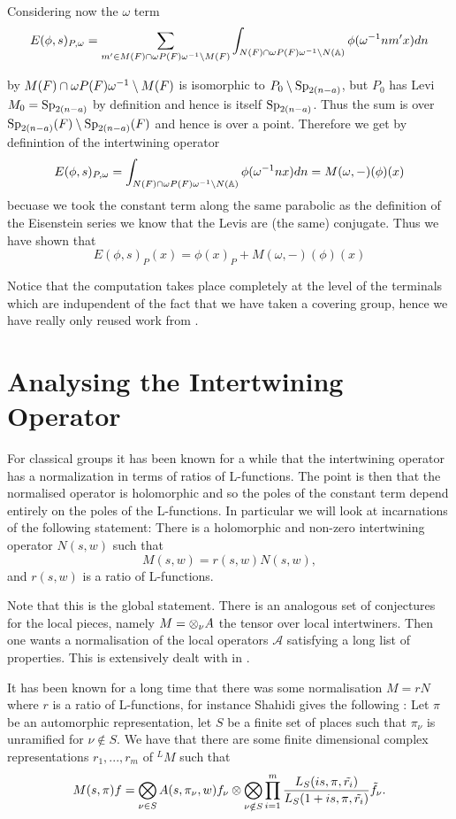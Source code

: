      Considering now the \(\omega\) term 
     \[E(\phi, s)_{P, \omega} =  \sum_{m'\in M(F)\cap \omega P(F)\omega\inv\setminus M(F)} \int_{N(F)\cap \omega P(F)\omega\inv \setminus N(\A)} \phi( \omega\inv nm' x)  dn\]

     by \cite[2C]{jiangPolesCertainResidual2013} \(M(F)\cap \omega P(F)\omega^{-1} \setminus M(F)\) is isomorphic to \(P_0 \setminus \operatorname{Sp}_{2(n-a)}\), but \(P_0\) has Levi \(M_0 = \operatorname{Sp}_{2(n-a)}\) by definition and hence is itself \(\operatorname{Sp}_{2(n-a)}\). Thus the sum is over \(\operatorname{Sp}_{2(n-a)}(F) \setminus \operatorname{Sp}_{2(n-a)}(F)\) and hence is over a point. Therefore we get by definintion of the intertwining operator
     \[E(\phi, s)_{P, \omega} = \int_{N(F)\cap \omega P(F)\omega\inv \setminus N(\A)} \phi( \omega\inv n x)  dn = M(\omega, -)(\phi)(x)\]
     becuase we took the constant term along the same parabolic as the definition of the Eisenstein series we know that the Levis are (the same) conjugate.
    Thus we have shown that 
    \[E(\phi, s)_P(x) = \phi(x)_P + M(\omega, - )(\phi)(x)\]

    Notice that the computation takes place completely at the level of the terminals which are indupendent of the fact that we have taken a covering group, hence we have really only reused work from \cite{jiangPolesCertainResidual2013}.

    \section{Analysing the Intertwining Operator}
    For classical groups it has been known for a while that the intertwining operator has a normalization in terms of ratios of L-functions. The point is then that the normalised operator is holomorphic and so the poles of the constant term depend entirely on the poles of the L-functions. In particular we will look at incarnations of the following statement: There is a holomorphic and non-zero intertwining operator \(N(s, w)\) such that 
    \[M(s, w) = r(s, w)N(s,w),\]
    and \(r(s, w)\) is a ratio of L-functions.

    Note that this is the global statement. There is an analogous set of conjectures for the local pieces, namely \(M = \otimes_\nu A\) the tensor over local intertwiners. Then one wants a normalisation of the local operators \(\mathscr{A}\) satisfying a long list of properties. This is extensively dealt with in \cite{shahidiProofLanglandsConjecture1990}.


    It has been known for a long time that there was some normalisation \(M = rN\) where \(r\) is a ratio of L-functions, for instance Shahidi gives the following \cite{shahidiRamanujanConjectureFiniteness1988}: Let \(\pi\) be an automorphic representation, let \(S\) be a finite set of places such that \(\pi_\nu\) is unramified for \(\nu\notin S\). We have that there are some finite dimensional complex representations \(r_1, ..., r_m\) of \(^LM\) such that 
     \[M(s, \pi)f = \bigotimes_{\nu\in S}A(s, \pi_\nu, w)f_\nu \otimes \bigotimes_{\nu\notin S} \prod_{i=1}^{m}\frac{L_S(is, \pi, \tilde{r_i})}{L_S(1+is, \pi, \tilde{r_i})} \tilde{f}_\nu.\]

